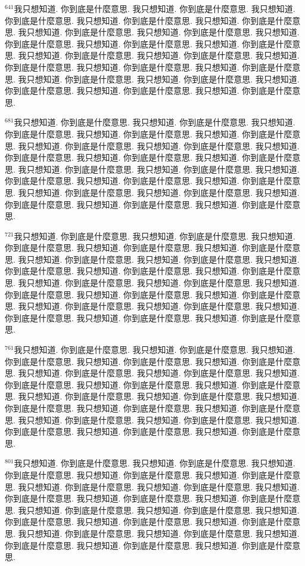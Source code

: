\documentclass{book}
\begin{document}
$^{641}$我只想知道.
你到底是什麼意思.
我只想知道.
你到底是什麼意思.
我只想知道.
你到底是什麼意思.
我只想知道.
你到底是什麼意思.
我只想知道.
你到底是什麼意思.
我只想知道.
你到底是什麼意思.
我只想知道.
你到底是什麼意思.
我只想知道.
你到底是什麼意思.
我只想知道.
你到底是什麼意思.
我只想知道.
你到底是什麼意思.
我只想知道.
你到底是什麼意思.
我只想知道.
你到底是什麼意思.
我只想知道.
你到底是什麼意思.
我只想知道.
你到底是什麼意思.
我只想知道.
你到底是什麼意思.
我只想知道.
你到底是什麼意思.
我只想知道.
你到底是什麼意思.
我只想知道.
你到底是什麼意思.
我只想知道.
你到底是什麼意思.
我只想知道.
你到底是什麼意思.

$^{681}$我只想知道.
你到底是什麼意思.
我只想知道.
你到底是什麼意思.
我只想知道.
你到底是什麼意思.
我只想知道.
你到底是什麼意思.
我只想知道.
你到底是什麼意思.
我只想知道.
你到底是什麼意思.
我只想知道.
你到底是什麼意思.
我只想知道.
你到底是什麼意思.
我只想知道.
你到底是什麼意思.
我只想知道.
你到底是什麼意思.
我只想知道.
你到底是什麼意思.
我只想知道.
你到底是什麼意思.
我只想知道.
你到底是什麼意思.
我只想知道.
你到底是什麼意思.
我只想知道.
你到底是什麼意思.
我只想知道.
你到底是什麼意思.
我只想知道.
你到底是什麼意思.
我只想知道.
你到底是什麼意思.
我只想知道.
你到底是什麼意思.
我只想知道.
你到底是什麼意思.

$^{721}$我只想知道.
你到底是什麼意思.
我只想知道.
你到底是什麼意思.
我只想知道.
你到底是什麼意思.
我只想知道.
你到底是什麼意思.
我只想知道.
你到底是什麼意思.
我只想知道.
你到底是什麼意思.
我只想知道.
你到底是什麼意思.
我只想知道.
你到底是什麼意思.
我只想知道.
你到底是什麼意思.
我只想知道.
你到底是什麼意思.
我只想知道.
你到底是什麼意思.
我只想知道.
你到底是什麼意思.
我只想知道.
你到底是什麼意思.
我只想知道.
你到底是什麼意思.
我只想知道.
你到底是什麼意思.
我只想知道.
你到底是什麼意思.
我只想知道.
你到底是什麼意思.
我只想知道.
你到底是什麼意思.
我只想知道.
你到底是什麼意思.
我只想知道.
你到底是什麼意思.

$^{761}$我只想知道.
你到底是什麼意思.
我只想知道.
你到底是什麼意思.
我只想知道.
你到底是什麼意思.
我只想知道.
你到底是什麼意思.
我只想知道.
你到底是什麼意思.
我只想知道.
你到底是什麼意思.
我只想知道.
你到底是什麼意思.
我只想知道.
你到底是什麼意思.
我只想知道.
你到底是什麼意思.
我只想知道.
你到底是什麼意思.
我只想知道.
你到底是什麼意思.
我只想知道.
你到底是什麼意思.
我只想知道.
你到底是什麼意思.
我只想知道.
你到底是什麼意思.
我只想知道.
你到底是什麼意思.
我只想知道.
你到底是什麼意思.
我只想知道.
你到底是什麼意思.
我只想知道.
你到底是什麼意思.
我只想知道.
你到底是什麼意思.
我只想知道.
你到底是什麼意思.

$^{801}$我只想知道.
你到底是什麼意思.
我只想知道.
你到底是什麼意思.
我只想知道.
你到底是什麼意思.
我只想知道.
你到底是什麼意思.
我只想知道.
你到底是什麼意思.
我只想知道.
你到底是什麼意思.
我只想知道.
你到底是什麼意思.
我只想知道.
你到底是什麼意思.
我只想知道.
你到底是什麼意思.
我只想知道.
你到底是什麼意思.
我只想知道.
你到底是什麼意思.
我只想知道.
你到底是什麼意思.
我只想知道.
你到底是什麼意思.
我只想知道.
你到底是什麼意思.
我只想知道.
你到底是什麼意思.
我只想知道.
你到底是什麼意思.
我只想知道.
你到底是什麼意思.
我只想知道.
你到底是什麼意思.
我只想知道.
你到底是什麼意思.
我只想知道.
你到底是什麼意思.
\end{document}
